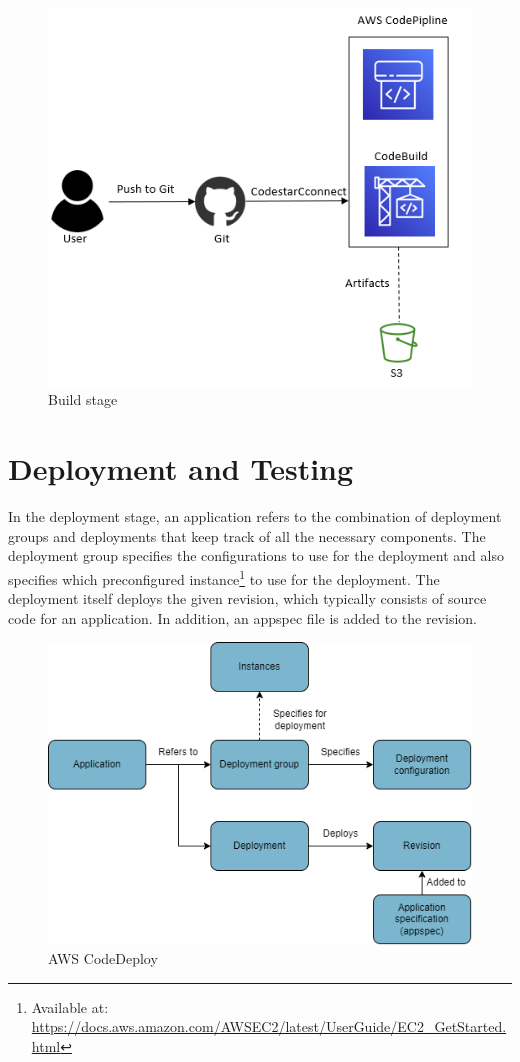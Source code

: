 \vspace{2mm}
\begin{figure}[H]
    \centering
    \includegraphics[width=0.6\columnwidth]{Images/aws-piplin-3.png}
    \caption{Build stage}
    \label{fig: Build stage}
\end{figure}

\section{Deployment and Testing}
\label{Deployment and Testing}
In the deployment stage, an application refers to the combination of deployment groups and deployments that keep track of all the necessary components. The deployment group specifies the configurations to use for the deployment and also specifies which preconfigured instance\footnote{Available at: \url{https://docs.aws.amazon.com/AWSEC2/latest/UserGuide/EC2_GetStarted.html}} to use for the deployment. The deployment itself deploys the given revision, which typically consists of source code for an application. In addition, an \gls{appspec} file is added to the revision. 

\vspace{2mm}
\begin{figure}[H]
    \centering
    \includegraphics[width=0.6\columnwidth]{Images/CodeDeploy.drawio.png}
    \caption{AWS CodeDeploy}
    \label{fig: AWS CodeDeploy}
\end{figure}

